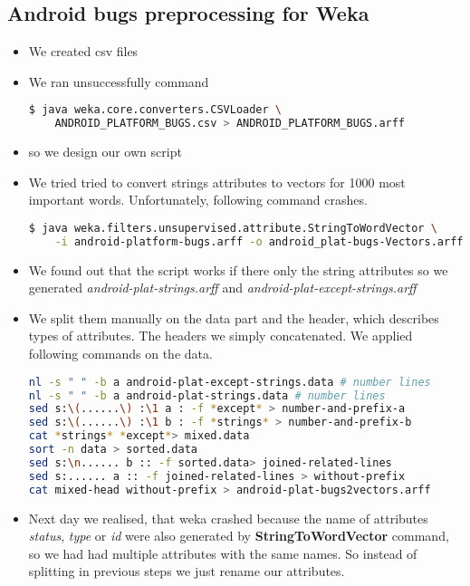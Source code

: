 \subsection*{Android bugs preprocessing for Weka} %
\label{sub:Android bugs preprocessing for Weka}
\begin{itemize}
    \item We created csv files
    \item We ran unsuccessfully command
\begin{lstlisting}[language=sh]
$ java weka.core.converters.CSVLoader \
    ANDROID_PLATFORM_BUGS.csv > ANDROID_PLATFORM_BUGS.arff
\end{lstlisting}
    \item so we design our own script
    \item  We tried tried to convert strings attributes to vectors for 1000 most important words. Unfortunately, following command crashes.
\begin{lstlisting}[language=sh]
$ java weka.filters.unsupervised.attribute.StringToWordVector \
    -i android-platform-bugs.arff -o android_plat-bugs-Vectors.arff
\end{lstlisting}
    \item We found out that the script works if there only the string attributes so we generated
    {\it android-plat-strings.arff} and {\it android-plat-except-strings.arff}
    \item We split them manually on the data part and the header, which describes types of attributes.
    The headers we simply concatenated.  We applied following commands on the data.
\begin{lstlisting}[language=sh]
nl -s " " -b a android-plat-except-strings.data # number lines
nl -s " " -b a android-plat-strings.data # number lines
sed s:\(......\) :\1 a : -f *except* > number-and-prefix-a
sed s:\(......\) :\1 b : -f *strings* > number-and-prefix-b
cat *strings* *except*> mixed.data
sort -n data > sorted.data
sed s:\n...... b :: -f sorted.data> joined-related-lines
sed s:...... a :: -f joined-related-lines > without-prefix
cat mixed-head without-prefix > android-plat-bugs2vectors.arff
\end{lstlisting}
    \item Next day we realised, that weka crashed because the name of attributes {\it status}, {\it type} or {\it id} were also generated by {\bf StringToWordVector} command, so we had had multiple attributes with the same names. So instead of splitting in previous steps we just rename our attributes.

\end{itemize}
